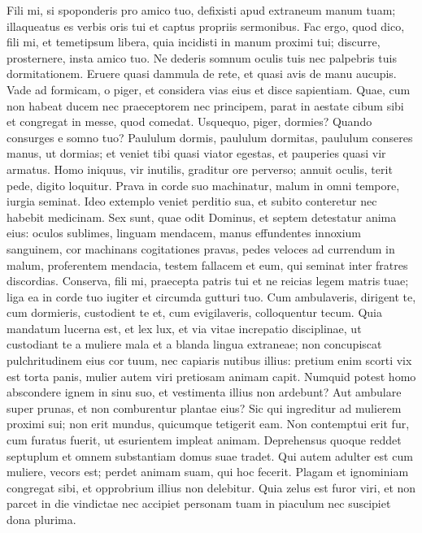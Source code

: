\begin{biblechapter}
\begin{biblechapter}
\begin{biblechapter}
\begin{biblechapter}
\begin{biblechapter}
\begin{biblechapter}
 \verse Fili mi, si spoponderis pro amico tuo,
 defixisti apud extraneum manum tuam;
 \verse illaqueatus es verbis oris tui
 et captus propriis sermonibus.
 \verse Fac ergo, quod dico, fili mi, et temetipsum libera,
 quia incidisti in manum proximi tui;
 discurre, prosternere, insta amico tuo.
 \verse Ne dederis somnum oculis tuis
 nec palpebris tuis dormitationem.
 \verse Eruere quasi dammula de rete,
 et quasi avis de manu aucupis.
 \verse Vade ad formicam, o piger,
 et considera vias eius et disce sapientiam.
 \verse Quae, cum non habeat ducem
 nec praeceptorem nec principem,
 \verse parat in aestate cibum sibi
 et congregat in messe, quod comedat.
 \verse Usquequo, piger, dormies?
 Quando consurges e somno tuo?
 \verse Paululum dormis, paululum dormitas,
 paululum conseres manus, ut dormias;
 \verse et veniet tibi quasi viator egestas,
 et pauperies quasi vir armatus.
 \verse Homo iniquus, vir inutilis,
 graditur ore perverso;
 \verse annuit oculis, terit pede,
 digito loquitur.
 \verse Prava in corde suo machinatur,
 malum in omni tempore, iurgia seminat.
 \verse Ideo extemplo veniet perditio sua,
 et subito conteretur nec habebit medicinam.
 \verse Sex sunt, quae odit Dominus,
 et septem detestatur anima eius:
 \verse oculos sublimes, linguam mendacem,
 manus effundentes innoxium sanguinem,
 \verse cor machinans cogitationes pravas,
 pedes veloces ad currendum in malum,
 \verse proferentem mendacia, testem fallacem
 et eum, qui seminat inter fratres discordias.
 \verse Conserva, fili mi, praecepta patris tui
 et ne reicias legem matris tuae;
 \verse liga ea in corde tuo iugiter
 et circumda gutturi tuo.
 \verse Cum ambulaveris, dirigent te,
 cum dormieris, custodient te
 et, cum evigilaveris, colloquentur tecum.
 \verse Quia mandatum lucerna est, et lex lux,
 et via vitae increpatio disciplinae,
 \verse ut custodiant te a muliere mala
 et a blanda lingua extraneae;
 \verse non concupiscat pulchritudinem eius cor tuum,
 nec capiaris nutibus illius:
 \verse pretium enim scorti vix est torta panis,
 mulier autem viri pretiosam animam capit.
 \verse Numquid potest homo abscondere ignem in sinu suo,
 et vestimenta illius non ardebunt?
 \verse Aut ambulare super prunas,
 et non comburentur plantae eius?
 \verse Sic qui ingreditur ad mulierem proximi sui;
 non erit mundus, quicumque tetigerit eam.
 \verse Non contemptui erit fur, cum furatus fuerit,
 ut esurientem impleat animam.
 \verse Deprehensus quoque reddet septuplum
 et omnem substantiam domus suae tradet.
 \verse Qui autem adulter est cum muliere, vecors est;
 perdet animam suam, qui hoc fecerit.
 \verse Plagam et ignominiam congregat sibi,
 et opprobrium illius non delebitur.
 \verse Quia zelus est furor viri,
 et non parcet in die vindictae
 \verse nec accipiet personam tuam in piaculum
 nec suscipiet dona plurima.
 

\end{biblechapter}
\end{biblechapter}
\end{biblechapter}
\end{biblechapter}
\end{biblechapter}
\end{biblechapter}
